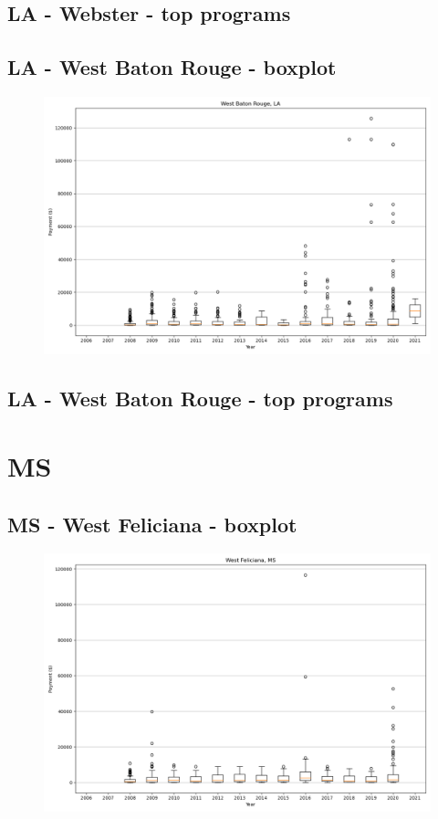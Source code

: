 \subsection*{LA - Webster - top programs}

\newpage
\subsection*{LA - West Baton Rouge - boxplot}
\begin{figure}[h]
\centering
\includegraphics[width=7in]{../output/boxplots/counties/West Baton Rouge-LA_boxplot.png}
\end{figure}


\subsection*{LA - West Baton Rouge - top programs}

\newpage
\section*{MS}
\subsection*{MS - West Feliciana - boxplot}
\begin{figure}[h]
\centering
\includegraphics[width=7in]{../output/boxplots/counties/West Feliciana-MS_boxplot.png}
\end{figure}


